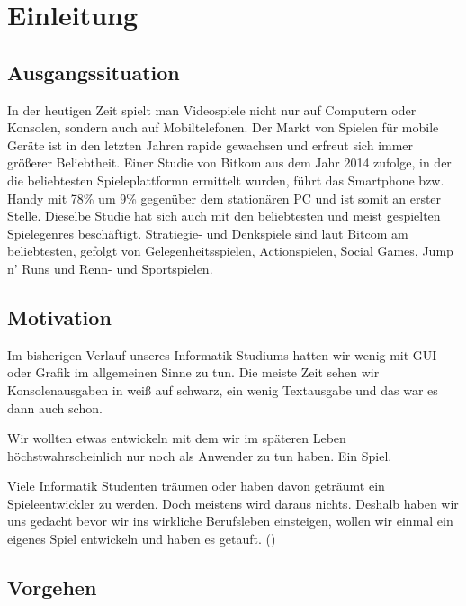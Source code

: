 \chapter{Einleitung}\label{ch:intro}

\section{Ausgangssituation}\label{sec:1_Ausgangssituation}

In der heutigen Zeit spielt man Videospiele nicht nur auf Computern oder Konsolen, sondern auch auf Mobiltelefonen. Der Markt von Spielen für mobile Geräte ist in den letzten Jahren rapide gewachsen und erfreut sich immer größerer Beliebtheit. Einer Studie von Bitkom \cite{bitkomgaming} aus dem Jahr 2014 zufolge, in der die beliebtesten Spieleplattformn ermittelt wurden, führt das Smartphone bzw. Handy mit 78\% um 9\% gegenüber dem stationären PC und ist somit an erster Stelle. Dieselbe Studie hat sich auch mit den beliebtesten und meist gespielten Spielegenres beschäftigt. Stratiegie- und Denkspiele sind laut Bitcom am beliebtesten, gefolgt von Gelegenheitsspielen, Actionspielen, Social Games, Jump n' Runs und Renn- und Sportspielen.




\section{Motivation}\label{sec:1_Motivation}

Im bisherigen Verlauf unseres Informatik-Studiums hatten wir wenig mit GUI oder Grafik im allgemeinen Sinne zu tun. Die meiste Zeit sehen wir Konsolenausgaben in weiß auf schwarz, ein wenig Textausgabe und das war es dann auch schon. 

Wir wollten etwas entwickeln mit dem wir im späteren Leben höchstwahrscheinlich nur noch als Anwender zu tun haben. Ein Spiel. 

Viele Informatik Studenten träumen oder haben davon geträumt ein Spieleentwickler zu werden. Doch meistens wird daraus nichts. Deshalb haben wir uns gedacht bevor wir ins wirkliche Berufsleben einsteigen, wollen wir einmal ein eigenes Spiel entwickeln und haben es \gamename getauft.
()

\section{Vorgehen}\label{sec:1_Vorgehen}


